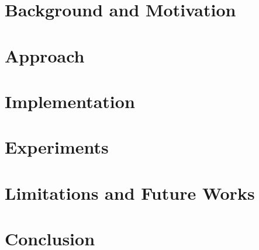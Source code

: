 \documentclass{Configuration_Files/PoliMi3i_thesis}
\begin{document}

\thispagestyle{empty}
\tableofcontents %
\thispagestyle{empty}
\cleardoublepage


\mainmatter %

\chapter{Background and Motivation}\label{chap:background}
	

\chapter{Approach}\label{chap:approach}
    

\chapter{Implementation}\label{chap:implementation}
    
\chapter{Experiments}\label{chap:experiment}
    
\chapter{Limitations and Future Works}\label{chap:limitations}
    
\chapter{Conclusion}\label{chap:conclusion}
    

\end{document}
